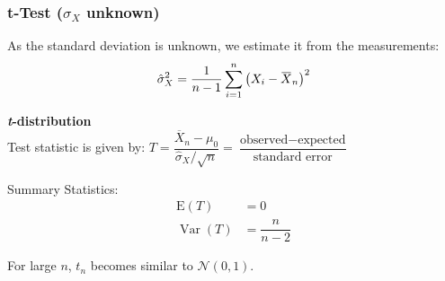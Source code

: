 \documentclass[11pt]{article}
\newcommand*\samplemean[1]{\overline{#1}}
\newcommand*\N[1]{\mathcal{N}\left(#1\right)}
\newcommand*\Var[1]{\mathop{\text{Var}}\left(#1\right)}
\newcommand{\overbar}[1]{\mkern 1.5mu\overline{\mkern-1.5mu#1\mkern-1.5mu}\mkern 1.5mu}
\begin{document}
\newpage
\subsubsection{t-Test ($\sigma_X$ unknown)}
As the standard deviation is unknown, we estimate it from the measurements:
\begin{equation*}
	\hat{\sigma}^2_X = \frac{1}{n-1} \sum_{i=1}^{n}\left(X_i-\overbar{X}_n\right)^2
\end{equation*}

\begin{definition}
	\textbf{\textit{t}-distribution}\\
	Test statistic is given by:
	$T=\dfrac{\samplemean{X}_n-\mu_0}{\hat{\sigma}_X/\sqrt{n}} =\dfrac{\text{observed} - \text{expected}}{\text{standard error}}$
\end{definition}

\noindent
Summary Statistics: 
\begin{align*}
	\text{E}(T) &= 0\\
	\Var{T} &= \dfrac{n}{n-2}
\end{align*}

\noindent
For large $n$, $t_n$ becomes similar to $\N{0, 1}$. 
\end{document}
